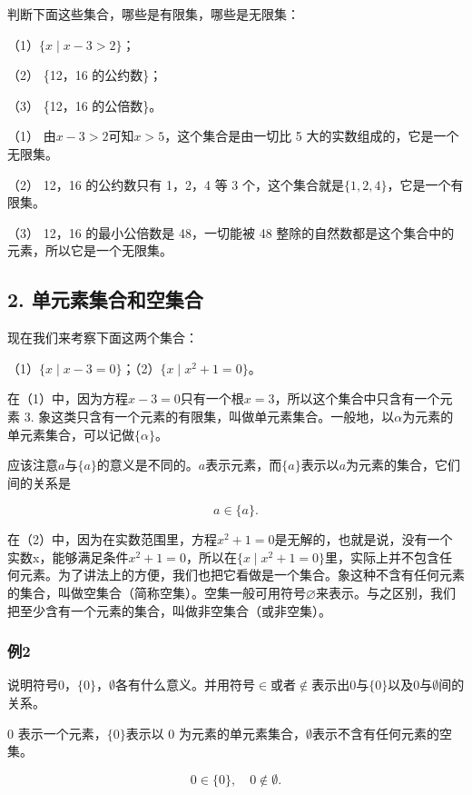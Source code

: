 判断下面这些集合，哪些是有限集，哪些是无限集：

（1）\(\{x \mid x - 3 > 2\}\)；

（2） \{12，16 的公约数\}；

（3） \{12，16 的公倍数\}。

 （1） 由\(x - 3 > 2\)可知\(x > 5\)，这个集合是由一切比 5
大的实数组成的，它是一个无限集。

（2） 12，16 的公约数只有 1，2，4 等 3
个，这个集合就是\(\{1, 2, 4\}\)，它是一个有限集。

（3） 12，16 的最小公倍数是 48，一切能被 48
整除的自然数都是这个集合中的元素，所以它是一个无限集。

\subsection{2. 单元素集合和空集合}

现在我们来考察下面这两个集合：

（1）\(\{x\mid x-3=0\}\)；（2）\(\{x\mid x^2+1=0\}\)。

在（1）中，因为方程\(x - 3 = 0\)只有一个根\(x = 3\)，所以这个集合中只含有一个元素
3.
象这类只含有一个元素的有限集，叫做单元素集合。一般地，以\(\alpha\)为元素的单元素集合，可以记做\(\{\alpha\}\)。

应该注意\(a\)与\(\{a\}\)的意义是不同的。\(a\)表示元素，而\(\{a\}\)表示以\(a\)为元素的集合，它们间的关系是

\[
a \in \{a \}.
\]

在（2）中，因为在实数范围里，方程\(x^{2}+1=0\)是无解的，也就是说，没有一个实数x，能够满足条件\(x^{2}+1=0\)，所以在\(\{x\mid x^{2}+1=0\}\)里，实际上并不包含任何元素。为了讲法上的方便，我们也把它看做是一个集合。象这种不含有任何元素的集合，叫做空集合（简称空集）。空集一般可用符号\(\varnothing\)来表示。与之区别，我们把至少含有一个元素的集合，叫做非空集合（或非空集）。

\subsubsection{例2}

说明符号0，\(\{0\}\)，\(\emptyset\)各有什么意义。并用符号\(\in\)或者\(\notin\)表示出0与\(\{0\}\)以及0与\(\emptyset\)间的关系。

 0 表示一个元素，\(\{0\}\)表示以 0
为元素的单元素集合，\(\emptyset\)表示不含有任何元素的空集。

\[
0 \in \{0 \}, \quad 0 \notin \emptyset.
\]

